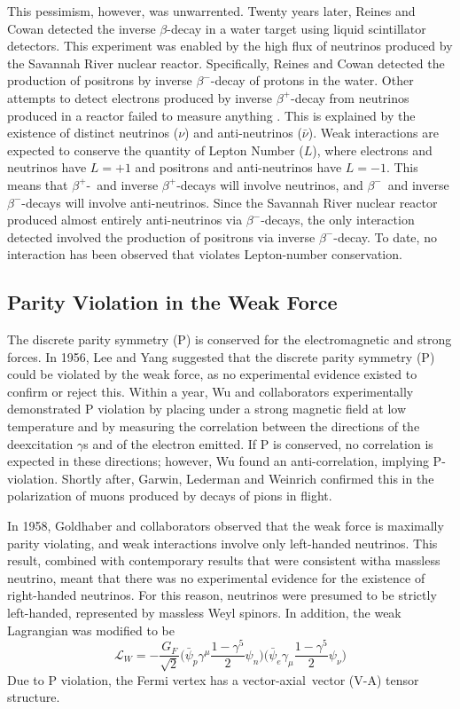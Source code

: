 \documentclass[/main.tex]{subfiles}
\begin{document}
This pessimism, however, was unwarrented.
Twenty years later, Reines and Cowan detected the inverse $\beta$-decay in a water target using liquid scintillator detectors\cite{Cowan1957}.
This experiment was enabled by the high flux of neutrinos produced by the Savannah River nuclear reactor.
Specifically, Reines and Cowan detected the production of positrons by inverse $\beta^-$-decay of protons in the water.
Other attempts to detect electrons produced by inverse $\beta^+$-decay from neutrinos produced in a reactor failed to measure anything \cite{Davis2002}.
This is explained by the existence of distinct neutrinos ($\nu$) and anti-neutrinos ($\bar{\nu}$).
Weak interactions are expected to conserve the quantity of Lepton Number ($L$), where electrons and neutrinos have $L=+1$ and positrons and anti-neutrinos have $L=-1$.
This means that $\beta^+$-~and inverse $\beta^+$-decays will involve neutrinos, and $\beta^-$~and inverse $\beta^-$-decays will involve anti-neutrinos.
Since the Savannah River nuclear reactor produced almost entirely anti-neutrinos via $\beta^-$-decays, the only interaction detected involved the production of positrons via inverse $\beta^-$-decay.
To date, no interaction has been observed that violates Lepton-number conservation.

\subsection{Parity Violation in the Weak Force}
The discrete parity symmetry (P) is conserved for the electromagnetic and strong forces.
In 1956, Lee and Yang suggested that the discrete parity symmetry (P) could be violated by the weak force, as no experimental evidence existed to confirm or reject this\cite{LeeYang1956}.
Within a year, Wu and collaborators experimentally demonstrated P violation by placing  under a strong magnetic field at low temperature and by measuring the correlation between the directions of the deexcitation $\gamma$s and of the electron emitted.
If P is conserved, no correlation is expected in these directions; however, Wu found an anti-correlation, implying P-violation\cite{Wu1957}.
Shortly after, Garwin, Lederman and Weinrich confirmed this in the polarization of muons produced by decays of pions in flight\cite{Garwin1957}.

In 1958, Goldhaber and collaborators observed that the weak force is maximally parity violating, and weak interactions involve only left-handed neutrinos\cite{Goldhaber1958}.
This result, combined with contemporary results that were consistent witha massless neutrino\cite{PDG2018}, meant that there was no experimental evidence for the existence of right-handed neutrinos.
For this reason, neutrinos were presumed to be strictly left-handed, represented by massless Weyl spinors.
In addition, the weak Lagrangian was modified to be
\begin{equation}
  \mathcal{L}_W=-\frac{G_F}{\sqrt{2}}\big(\bar \psi_p \gamma^\mu \frac{1-\gamma^5}{2} \psi_n\big)\big(\bar \psi_e \gamma_\mu \frac{1-\gamma^5}{2} \psi_\nu\big)
\end{equation}
Due to P violation, the Fermi vertex has a vector-axial~vector (V-A) tensor structure.
\end{document}
